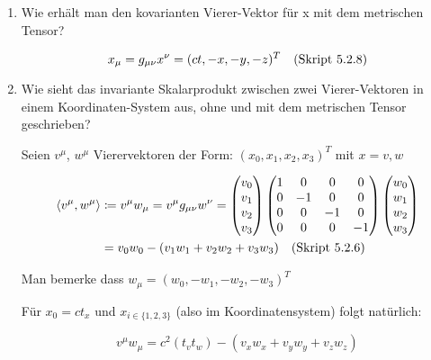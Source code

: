 \begin{enumerate}
    \item Wie erhält man den kovarianten Vierer-Vektor für x mit dem
      metrischen Tensor?

      \begin{equation*}
        x_\mu = g_{\mu\nu}x^\nu=
        (ct, -x, -y, -z)^T
        \quad\text{(Skript 5.2.8)}
      \end{equation*}

    \item Wie sieht das invariante Skalarprodukt zwischen zwei 
      Vierer-Vektoren in einem Koordinaten-System aus, ohne und mit
      dem metrischen Tensor geschrieben?
      
      Seien $v^\mu$, $w^\mu$ Vierervektoren der Form: 
      $(x_0, x_1, x_2, x_3)^T$ mit $x=v,w$

      \begin{equation*}
        \begin{split}
        \langle v^\mu , w^\mu \rangle 
        &\coloneqq v^\mu w_\mu = 
        v^\mu g_{\mu\nu} w^\nu
        =
        \begin{pmatrix}
          v_0 \\ v_1 \\ v_2 \\ v_3
        \end{pmatrix}
        \begin{pmatrix}
          1 & 0  & 0  &  0\\
          0 & -1 & 0  &  0\\
          0 & 0  & -1 &  0\\
          0 & 0  & 0  & -1\\
        \end{pmatrix}
        \begin{pmatrix}
          w_0 \\ w_1 \\ w_2 \\ w_3
        \end{pmatrix}\\
        &=v_0w_0 - (v_1w_1 + v_2w_2 + v_3w_3)
        \quad\text{(Skript 5.2.6)}
        \end{split}
      \end{equation*}

      Man bemerke dass $w_\mu=(w_0, -w_1, -w_2, -w_3)^T$

      Für $x_0=ct_x$ und $x_{i\in\{1,2,3\}}$ (also im Koordinatensystem) 
      folgt natürlich:

      \begin{equation*}
        v^\mu w_\mu = c^2(t_vt_w) - (v_xw_x + v_yw_y + v_zw_z)
      \end{equation*}


\end{enumerate}
